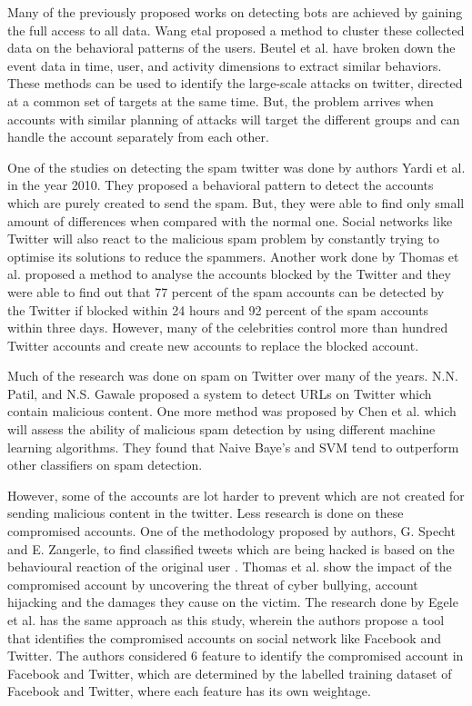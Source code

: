 \documentclass[conference]{IEEEtran}
\begin{document}
Many of the previously proposed works on detecting bots are achieved by gaining the full access to all data. Wang etal proposed a method to cluster these collected data on the behavioral patterns of the users. Beutel et al. have broken down the event data in time, user, and activity dimensions to extract similar behaviors. These methods can be used to identify the large-scale attacks on twitter, directed at a common set of targets at the same time. But, the problem arrives when accounts with similar planning of attacks will target the different groups and can handle the account separately from each other.

One of the studies on detecting the spam twitter was done by authors Yardi et al. \cite{5} in the year 2010. They proposed a behavioral pattern to detect the accounts which are purely created to send the spam. But, they were able to find only small amount of differences when compared with the normal one. Social networks like Twitter will also react to the malicious spam problem by constantly trying to optimise its solutions to reduce the spammers. Another work done by Thomas et al. \cite{6} proposed a method to analyse the accounts blocked by the Twitter and they were able to find out that 77 percent of the spam accounts can be detected by the Twitter if blocked within 24 hours and 92 percent of the spam accounts within three days. However, many of the celebrities control more than hundred Twitter accounts and create new accounts to replace the blocked account.

Much of the research was done on spam on Twitter over many of the years. N.N. Patil, and N.S. Gawale proposed a system to detect URLs on Twitter which contain malicious content\cite{7}. One more method was proposed by Chen et al. \cite{8} which will assess the ability of malicious spam detection by using different machine learning algorithms. They found that Naive Baye's and SVM tend to outperform other classifiers on spam detection.

However, some of the accounts are lot harder to prevent which are not created for sending malicious content in the twitter. Less research is done on these compromised accounts. One of the methodology proposed by authors, G. Specht and  E. Zangerle, to find classified tweets which are being hacked is based on the behavioural reaction of the original user \cite{8}. Thomas et al. \cite{9} show the impact of the compromised account by uncovering the threat of cyber bullying, account hijacking and the damages they cause on the victim. The research done by Egele et al. \cite{10}  has the same approach as this study, wherein the authors propose a tool that identifies the compromised accounts on social network like Facebook and Twitter. The authors considered 6 feature to identify the compromised account in Facebook and Twitter, which are determined by the labelled training dataset of Facebook and Twitter, where each feature has its own weightage.
\end{document}
